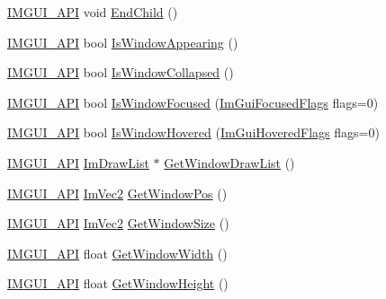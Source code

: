 \begin{DoxyCompactItemize}
\item 
\mbox{\hyperlink{imgui_8h_a43829975e84e45d1149597467a14bbf5}{I\+M\+G\+U\+I\+\_\+\+A\+PI}} void \mbox{\hyperlink{namespace_im_gui_af8de559a88c1442d6df8c1b04c86e997}{End\+Child}} ()
\item 
\mbox{\hyperlink{imgui_8h_a43829975e84e45d1149597467a14bbf5}{I\+M\+G\+U\+I\+\_\+\+A\+PI}} bool \mbox{\hyperlink{namespace_im_gui_a99fd14154aae264087d471132e56a42e}{Is\+Window\+Appearing}} ()
\item 
\mbox{\hyperlink{imgui_8h_a43829975e84e45d1149597467a14bbf5}{I\+M\+G\+U\+I\+\_\+\+A\+PI}} bool \mbox{\hyperlink{namespace_im_gui_a2a6492aea9013c0078fc530a66e11768}{Is\+Window\+Collapsed}} ()
\item 
\mbox{\hyperlink{imgui_8h_a43829975e84e45d1149597467a14bbf5}{I\+M\+G\+U\+I\+\_\+\+A\+PI}} bool \mbox{\hyperlink{namespace_im_gui_a51ed119ab4be7fcf47a34644e262c87e}{Is\+Window\+Focused}} (\mbox{\hyperlink{imgui_8h_a4445363c9e1c008fee2c255d83046248}{Im\+Gui\+Focused\+Flags}} flags=0)
\item 
\mbox{\hyperlink{imgui_8h_a43829975e84e45d1149597467a14bbf5}{I\+M\+G\+U\+I\+\_\+\+A\+PI}} bool \mbox{\hyperlink{namespace_im_gui_aaed1ebf40cc2cb2ec30b0ba39b91d4a5}{Is\+Window\+Hovered}} (\mbox{\hyperlink{imgui_8h_a3a8f688665e5ea0bd9700e1251580a2c}{Im\+Gui\+Hovered\+Flags}} flags=0)
\item 
\mbox{\hyperlink{imgui_8h_a43829975e84e45d1149597467a14bbf5}{I\+M\+G\+U\+I\+\_\+\+A\+PI}} \mbox{\hyperlink{struct_im_draw_list}{Im\+Draw\+List}} $\ast$ \mbox{\hyperlink{namespace_im_gui_aa100c22a9feafe843fa12c66590cbda0}{Get\+Window\+Draw\+List}} ()
\item 
\mbox{\hyperlink{imgui_8h_a43829975e84e45d1149597467a14bbf5}{I\+M\+G\+U\+I\+\_\+\+A\+PI}} \mbox{\hyperlink{struct_im_vec2}{Im\+Vec2}} \mbox{\hyperlink{namespace_im_gui_a413d939f3ef416a47d6e5b48be955146}{Get\+Window\+Pos}} ()
\item 
\mbox{\hyperlink{imgui_8h_a43829975e84e45d1149597467a14bbf5}{I\+M\+G\+U\+I\+\_\+\+A\+PI}} \mbox{\hyperlink{struct_im_vec2}{Im\+Vec2}} \mbox{\hyperlink{namespace_im_gui_aaa5c0bfac7125ba9850a08b6db2e90c9}{Get\+Window\+Size}} ()
\item 
\mbox{\hyperlink{imgui_8h_a43829975e84e45d1149597467a14bbf5}{I\+M\+G\+U\+I\+\_\+\+A\+PI}} float \mbox{\hyperlink{namespace_im_gui_a471ff23945b99541c506dbdc2a9004cf}{Get\+Window\+Width}} ()
\item 
\mbox{\hyperlink{imgui_8h_a43829975e84e45d1149597467a14bbf5}{I\+M\+G\+U\+I\+\_\+\+A\+PI}} float \mbox{\hyperlink{namespace_im_gui_a44d2bfb80e0d2dd232a553ab29a91b52}{Get\+Window\+Height}} ()

\end{DoxyCompactItemize}
